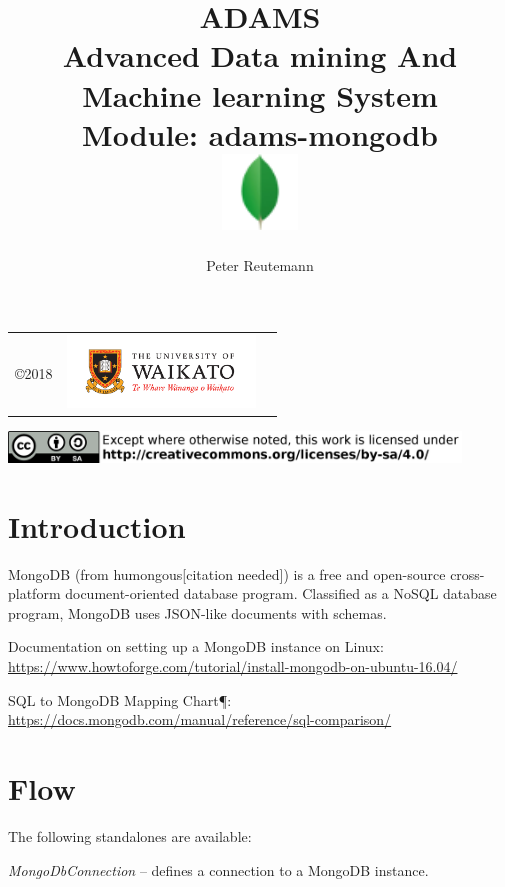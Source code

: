 \documentclass[a4paper]{book}
\title{
  \textbf{ADAMS} \\
  {\Large \textbf{A}dvanced \textbf{D}ata mining \textbf{A}nd \textbf{M}achine
  learning \textbf{S}ystem} \\
  {\Large Module: adams-mongodb} \\
  \vspace{1cm}
  \includegraphics[width=2cm]{images/mongodb-module.png} \\
}
\author{
  Peter Reutemann
}
\begin{document}
\begin{titlepage}
\maketitle

\thispagestyle{empty}
\center
\begin{table}[b]
	\begin{tabular}{c l l}
		\parbox[c][2cm]{2cm}{\copyright 2018} &
		\parbox[c][2cm]{5cm}{\includegraphics[width=5cm]{images/coat_of_arms.pdf}} \\
	\end{tabular}
	\includegraphics[width=12cm]{images/cc.png} \\
\end{table}

\end{titlepage}

\tableofcontents

\chapter{Introduction}
MongoDB (from humongous[citation needed]) is a free and open-source cross-platform
document-oriented database program. Classified as a NoSQL\cite{nosql} database program,
MongoDB uses JSON-like\cite{json} documents with schemas.

\begin{tight_itemize}
  \item Documentation on setting up a MongoDB instance on Linux: \\
    \url{https://www.howtoforge.com/tutorial/install-mongodb-on-ubuntu-16.04/}{}
  \item SQL to MongoDB Mapping Chart¶: \\
    \url{https://docs.mongodb.com/manual/reference/sql-comparison/}{}
\end{tight_itemize}

\chapter{Flow}
The following standalones are available:
\begin{tight_itemize}
  \item \textit{MongoDbConnection} -- defines a connection to a MongoDB instance.
\end{tight_itemize}
\end{document}
